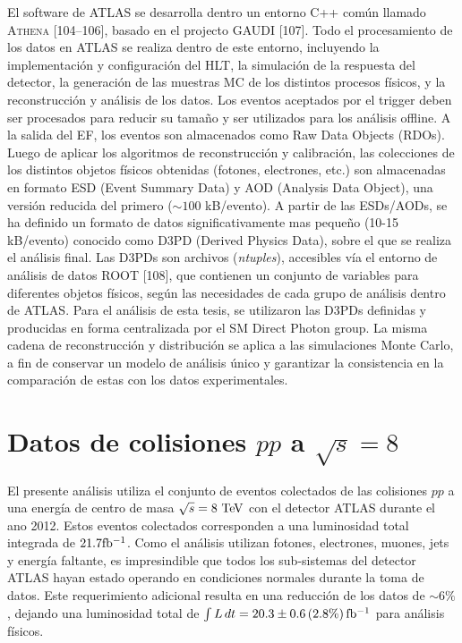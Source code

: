El
software de ATLAS se desarrolla dentro un entorno C++ común llamado
\textsc{Athena} [104–106], basado en el projecto GAUDI [107]. Todo el
procesamiento de los datos en ATLAS se realiza dentro de este entorno,
incluyendo la implementación y configuración del HLT, la simulación de la
respuesta del detector, la generación de las muestras MC de los distintos
procesos físicos, y la reconstrucción y análisis de los datos. Los eventos
aceptados por el trigger deben ser procesados para reducir su tamaño y ser
utilizados para los análisis offline. A la salida del EF, los eventos son
almacenados como Raw Data Objects (RDOs). Luego de aplicar los algoritmos de
reconstrucción y calibración, las colecciones de los distintos objetos físicos
obtenidas (fotones, electrones, etc.) son almacenadas en formato ESD (Event
Summary Data) y AOD (Analysis Data Object), una versión reducida del primero
($\sim 100$ kB/evento). A partir de las ESDs/AODs, se ha definido un formato de
datos significativamente mas pequeño (10-15 kB/evento) conocido como D3PD
(Derived Physics Data), sobre el que se realiza el análisis final. Las D3PDs son
archivos (\emph{ntuples}), accesibles vía el entorno de análisis de datos ROOT
[108], que contienen un conjunto de variables para diferentes objetos físicos,
según las necesidades de cada grupo de análisis dentro de ATLAS. Para el
análisis de esta tesis, se utilizaron las D3PDs definidas y producidas en forma
centralizada por el SM Direct Photon group. La misma cadena de reconstrucción y
distribución se aplica a las simulaciones Monte Carlo, a fin de conservar un
modelo de análisis único y garantizar la consistencia en la comparación de estas
con los datos experimentales.



\section{Datos de colisiones $pp$ a $\sqrt{s} = 8$ \tev}

El presente análisis utiliza el conjunto de eventos colectados de las colisiones
$pp$ a una energía de centro de masa $\sqrt{s} = 8\tev$ con el detector ATLAS
durante el ano 2012. Estos eventos colectados corresponden a una luminosidad
total integrada de $21.7 \mbox{fb$^{-1}$}$. Como el análisis utilizan fotones, electrones,
muones, jets y energía faltante, es impresindible que todos los sub-sistemas
del detector ATLAS hayan estado operando en condiciones normales durante la toma
de datos. Este requerimiento adicional resulta en una reducción de los datos de
$\sim 6\%$, dejando una luminosidad total de $\int L\, dt = 20.3 \pm 0.6\, (2.8
\%) \, \mbox{fb$^{-1}$}$\cite{lumi2012} para análisis físicos.





